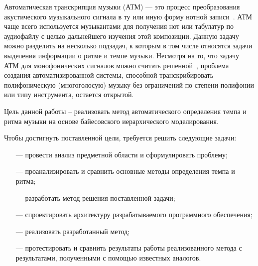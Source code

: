 
Автоматическая транскрипция музыки (АТМ) — это процесс преобразования акустического музыкального сигнала в ту или иную форму нотной записи~\cite{future_dir}. АТМ чаще всего используется музыкантами для получения нот или табулатур по аудиофайлу с целью дальнейшего изучения этой композиции. Данную задачу можно разделить на несколько подзадач, к которым в том числе относятся задачи выделения информации о ритме и темпе музыки. Несмотря на то, что задачу АТМ для монофонических сигналов можно считать решенной~\cite{future_dir}, проблема создания автоматизированной системы, способной транскрибировать полифоническую (многоголосую) музыку без ограничений по степени полифонии или типу инструмента, остается открытой.

Цель данной работы – реализовать метод автоматического определения темпа и ритма музыки на основе байесовского иерархического моделирования.

Чтобы достигнуть поставленной цели, требуется решить следующие задачи:
\begin{itemize}
	\item[---] провести анализ предметной области и сформулировать проблему;
	\item[---] проанализировать и сравнить основные методы определения темпа и ритма;
	\item[---] разработать метод решения поставленной задачи;
	\item[---] спроектировать архитектуру разрабатываемого программного обеспечения;
	\item[---] реализовать разработанный метод;
	\item[---] протестировать и сравнить результаты работы реализованного метода с результатами, полученными с помощью известных аналогов.
\end{itemize}